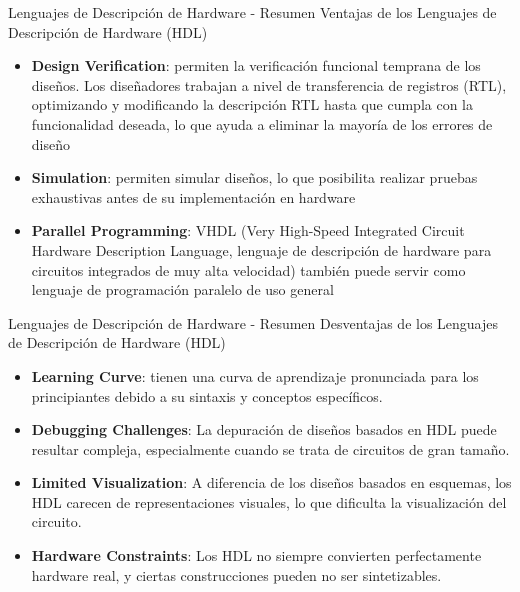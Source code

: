 \documentclass[11pt]{beamer}
\begin{document}
\begin{frame}{Lenguajes de Descripción de Hardware - Resumen}
	Ventajas de los Lenguajes de Descripción de Hardware (HDL)\newline
	\begin{itemize}
		\item \textbf{Design Verification}: permiten la verificación funcional temprana de los diseños. Los diseñadores trabajan a nivel de transferencia de registros (RTL), optimizando y modificando la descripción RTL hasta que cumpla con la funcionalidad deseada, lo que ayuda a eliminar la mayoría de los errores de diseño
		\item \textbf{Simulation}: permiten simular diseños, lo que posibilita realizar pruebas exhaustivas antes de su implementación en hardware
		\item \textbf{Parallel Programming}: VHDL (Very High-Speed Integrated Circuit Hardware Description Language, lenguaje de descripción de hardware para circuitos integrados de muy alta velocidad) también puede servir como lenguaje de programación paralelo de uso general
	\end{itemize}
\end{frame}


\begin{frame}{Lenguajes de Descripción de Hardware - Resumen}	
	Desventajas de los Lenguajes de Descripción de Hardware (HDL) \newline
	\begin{itemize}
		\item \textbf{Learning Curve}: tienen una curva de aprendizaje pronunciada para los principiantes debido a su sintaxis y conceptos específicos.
		\item \textbf{Debugging Challenges}: La depuración de diseños basados en HDL puede resultar compleja, especialmente cuando se trata de circuitos de gran tamaño.
		\item \textbf{Limited Visualization}: A diferencia de los diseños basados en esquemas, los HDL carecen de representaciones visuales, lo que dificulta la visualización del circuito.
		\item \textbf{Hardware Constraints}: Los HDL no siempre convierten perfectamente hardware real, y ciertas construcciones pueden no ser sintetizables.
	\end{itemize}
\end{frame}
\end{document}
